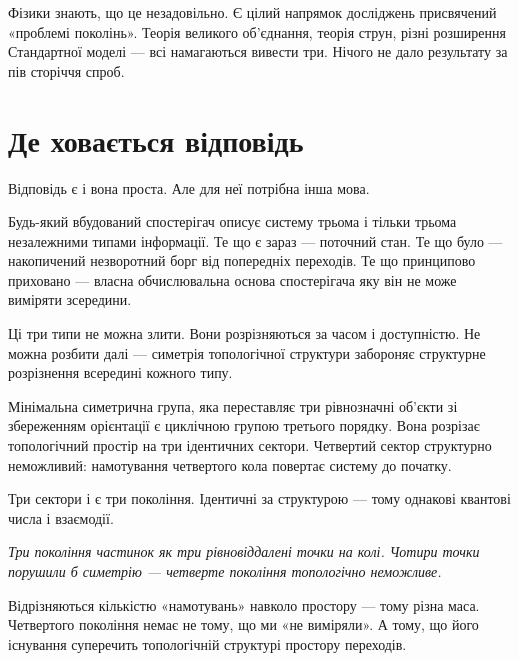\documentclass[12pt, a4paper, openany]{book}
\begin{document}
Фізики знають, що це незадовільно. Є цілий напрямок досліджень присвячений «проблемі поколінь». Теорія великого об'єднання, теорія струн, різні розширення Стандартної моделі --- всі намагаються вивести три. Нічого не дало результату за пів сторіччя спроб.

\section{Де ховається відповідь}

Відповідь є і вона проста. Але для неї потрібна інша мова.

Будь-який вбудований спостерігач описує систему трьома і тільки трьома незалежними типами інформації. Те що є зараз --- поточний стан. Те що було --- накопичений незворотний борг від попередніх переходів. Те що принципово приховано --- власна обчислювальна основа спостерігача яку він не може виміряти зсередини.

Ці три типи не можна злити. Вони розрізняються за часом і доступністю. Не можна розбити далі --- симетрія топологічної структури забороняє структурне розрізнення всередині кожного типу.

Мінімальна симетрична група, яка переставляє три рівнозначні об'єкти зі збереженням орієнтації є циклічною групою третього порядку. Вона розрізає топологічний простір на три ідентичних сектори. Четвертий сектор структурно неможливий: намотування четвертого кола повертає систему до початку.

Три сектори і є три покоління. Ідентичні за структурою --- тому однакові квантові числа і взаємодії.

\begin{center}
\medskip
\begin{center}
{\small\itshape Три покоління частинок як три рівновіддалені точки на колі. Чотири точки порушили б симетрію — четверте покоління топологічно неможливе.}
\end{center}
\end{center}
 Відрізняються кількістю «намотувань» навколо простору --- тому різна маса. Четвертого покоління немає не тому, що ми «не виміряли». А тому, що його існування суперечить топологічній структурі простору переходів.
\end{document}
